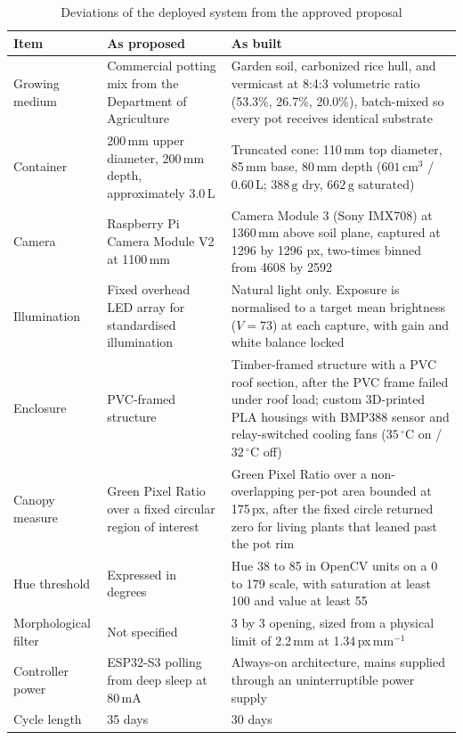 \begin{table}[ht]
\centering
\caption{Deviations of the deployed system from the approved proposal}
\label{tab:deviations}
\footnotesize
\begin{tabularx}{\linewidth}{lXX}
\toprule
\textbf{Item} & \textbf{As proposed} & \textbf{As built} \\
\midrule
Growing medium & Commercial potting mix from the Department of Agriculture &
Garden soil, carbonized rice hull, and vermicast at 8:4:3 volumetric ratio (53.3\%, 26.7\%, 20.0\%), batch-mixed so every pot receives identical substrate \\
Container & 200\,mm upper diameter, 200\,mm depth, approximately 3.0\,L &
Truncated cone: 110\,mm top diameter, 85\,mm base, 80\,mm depth ($601\,\mathrm{cm}^3$ / $0.60\,\mathrm{L}$; $388\,\mathrm{g}$ dry, $662\,\mathrm{g}$ saturated) \\
Camera & Raspberry Pi Camera Module V2 at 1100\,mm &
Camera Module 3 (Sony IMX708) at 1360\,mm above soil plane, captured at 1296 by 1296 px, two-times binned from 4608 by 2592 \\
Illumination & Fixed overhead LED array for standardised illumination &
Natural light only. Exposure is normalised to a target mean brightness ($V = 73$) at each capture, with gain and white balance locked \\
Enclosure & PVC-framed structure & Timber-framed structure with a PVC roof
section, after the PVC frame failed under roof load; custom 3D-printed PLA housings with BMP388 sensor and relay-switched cooling fans ($35\,^\circ\mathrm{C}$ on / $32\,^\circ\mathrm{C}$ off) \\
Canopy measure & Green Pixel Ratio over a fixed circular region of interest &
Green Pixel Ratio over a non-overlapping per-pot area bounded at 175\,px,
after the fixed circle returned zero for living plants that leaned past the
pot rim \\
Hue threshold & Expressed in degrees &
Hue 38 to 85 in OpenCV units on a 0 to 179 scale, with saturation at least 100
and value at least 55 \\
Morphological filter & Not specified &
3 by 3 opening, sized from a physical limit of 2.2\,mm at
1.34\,px\,mm$^{-1}$ \\
Controller power & ESP32-S3 polling from deep sleep at 80\,mA &
Always-on architecture, mains supplied through an uninterruptible power supply \\
Cycle length & 35 days & 30 days \\
\bottomrule
\end{tabularx}
\end{table}

